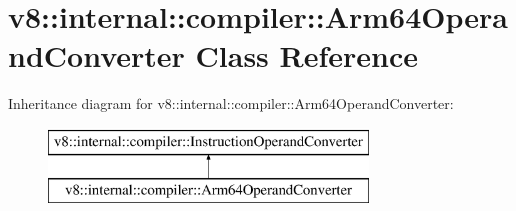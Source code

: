 \hypertarget{classv8_1_1internal_1_1compiler_1_1_arm64_operand_converter}{}\section{v8\+:\+:internal\+:\+:compiler\+:\+:Arm64\+Operand\+Converter Class Reference}
\label{classv8_1_1internal_1_1compiler_1_1_arm64_operand_converter}
Inheritance diagram for v8\+:\+:internal\+:\+:compiler\+:\+:Arm64\+Operand\+Converter\+:\begin{figure}[H]
\begin{center}
\leavevmode
\includegraphics[height=2.000000cm]{classv8_1_1internal_1_1compiler_1_1_arm64_operand_converter}
\end{center}
\end{figure}
